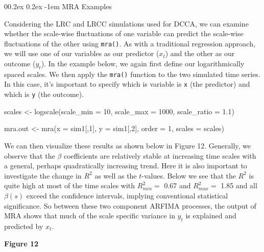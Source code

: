 \documentclass[
  man]{apa6}
\makeatletter
\newenvironment{Shaded}{\begin{snugshade}}{\end{snugshade}}
\newcommand{\AttributeTok}[1]{\textcolor[rgb]{0.77,0.63,0.00}{#1}}
\newcommand{\DecValTok}[1]{\textcolor[rgb]{0.00,0.00,0.81}{#1}}
\newcommand{\FloatTok}[1]{\textcolor[rgb]{0.00,0.00,0.81}{#1}}
\newcommand{\FunctionTok}[1]{\textcolor[rgb]{0.00,0.00,0.00}{#1}}
\newcommand{\NormalTok}[1]{#1}
\newcommand{\OtherTok}[1]{\textcolor[rgb]{0.56,0.35,0.01}{#1}}
\let\oldparagraph\paragraph
\renewcommand{\paragraph}[1]{\oldparagraph{#1}\mbox{}}
\renewcommand{\paragraph}{\@startsection{paragraph}{4}{\parindent}%
  {0\baselineskip \@plus 0.2ex \@minus 0.2ex}%
  {-1em}%
  {\normalfont\normalsize\bfseries\itshape\typesectitle}}
\makeatother
\begin{document}
\hypertarget{mra-examples}{%
\paragraph{MRA Examples}\label{mra-examples}}

Considering the LRC and LRCC simulations used for DCCA, we can examine
whether the scale-wise fluctuations of one variable can predict the
scale-wise fluctuations of the other using \texttt{mra()}. As with a
traditional regression approach, we will use one of our variables as our
predictor (\(x_t\)) and the other as our outcome (\(y_t\)). In the example
below, we again first define our logarithmically spaced scales. We then
apply the \texttt{mra()} function to the two simulated time series. In this
case, it's important to specify which is variable is \texttt{x} (the predictor)
and which is \texttt{y} (the outcome).

\begin{Shaded}
\begin{Highlighting}[]
\NormalTok{scales }\OtherTok{\textless{}{-}} \FunctionTok{logscale}\NormalTok{(}\AttributeTok{scale\_min =} \DecValTok{10}\NormalTok{, }\AttributeTok{scale\_max =} \DecValTok{1000}\NormalTok{, }\AttributeTok{scale\_ratio =} \FloatTok{1.1}\NormalTok{)}

\NormalTok{mra.out }\OtherTok{\textless{}{-}} \FunctionTok{mra}\NormalTok{(}\AttributeTok{x =}\NormalTok{ sim1[,}\DecValTok{1}\NormalTok{], }\AttributeTok{y =}\NormalTok{ sim1[,}\DecValTok{2}\NormalTok{], }\AttributeTok{order =} \DecValTok{1}\NormalTok{, }\AttributeTok{scales =}\NormalTok{ scales)}
\end{Highlighting}
\end{Shaded}

We can then visualize these results as shown below in Figure 12.
Generally, we observe that the \(\beta\) coefficients are relatively
stable at increasing time scales with a general, perhaps quadratically
increasing trend. Here it is also important to investigate the change in
\(R^2\) as well as the \(t\)-values. Below we see that the \(R^2\) is quite
high at most of the time scales with \(R^2_{min} =\)
0.67 and \(R^2_{max} =\)
1.85 and all \(\beta(s)\) exceed the confidence
intervals, implying conventional statistical significance. So between
these two component ARFIMA processes, the output of MRA shows that much
of the scale specific variance in \(y_t\) is explained and predicted by
\(x_t\).

\textbf{Figure 12}
\end{document}
